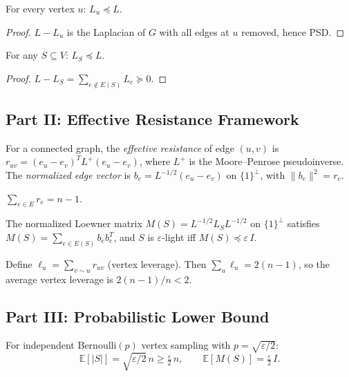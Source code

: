 \begin{lemma}\label{lem:q6-vertex}
For every vertex $u$: $L_u\preceq L$.
\end{lemma}
\begin{proof}
$L-L_u$ is the Laplacian of $G$ with all edges at $u$ removed, hence PSD.
\end{proof}

\begin{lemma}[Monotonicity]\label{lem:q6-mono}
For any $S\subseteq V$: $L_S\preceq L$.
\end{lemma}
\begin{proof}
$L-L_S=\sum_{e\notin E(S)}L_e\succeq 0$.
\end{proof}

\subsection*{Part II: Effective Resistance Framework}

\begin{definition}
For a connected graph, the \emph{effective resistance} of edge $(u,v)$ is $r_{uv}=(e_u-e_v)^TL^+(e_u-e_v)$, where $L^+$ is the Moore--Penrose pseudoinverse. The \emph{normalized edge vector} is $b_e=L^{-1/2}(e_u-e_v)$ on $\{1\}^\perp$, with $\|b_e\|^2=r_e$.
\end{definition}

\begin{lemma}\label{lem:q6-foster}
$\sum_{e\in E}r_e=n-1$.
\end{lemma}

\begin{lemma}\label{lem:q6-norm}
The normalized Loewner matrix $M(S)=L^{-1/2}L_SL^{-1/2}$ on $\{1\}^\perp$ satisfies $M(S)=\sum_{e\in E(S)}b_eb_e^T$, and $S$ is $\varepsilon$-light iff $M(S)\preceq\varepsilon\,I$.
\end{lemma}

\begin{lemma}\label{lem:q6-leverage}
Define $\ell_u=\sum_{v\sim u}r_{uv}$ (vertex leverage). Then $\sum_u\ell_u=2(n-1)$, so the average vertex leverage is $2(n-1)/n<2$.
\end{lemma}

\subsection*{Part III: Probabilistic Lower Bound}

\begin{proposition}\label{prop:q6-prob}
For independent Bernoulli$(p)$ vertex sampling with $p=\sqrt{\varepsilon/2}$:
\[
\mathbb E[|S|]=\sqrt{\varepsilon/2}\,n\ge\tfrac\varepsilon2\,n,\qquad
\mathbb E[M(S)]=\tfrac\varepsilon2\,I.
\]
\end{proposition}

